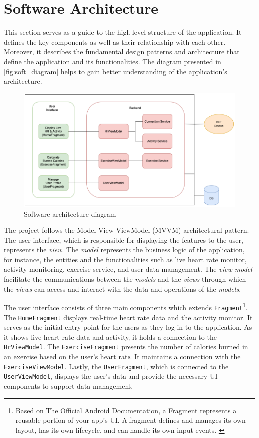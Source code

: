\section{Software Architecture}
This section serves as a guide to the high level structure of the application. It defines the key components as well as their relationship with each other.
Moreover, it describes the fundamental design patterns and architecture that define the application and its functionalities. 
The diagram presented in \autoref{fig:soft_diagram} helps to gain better understanding of the application's architecture.
\begin{figure}[H]
    \centering
    \includegraphics[width=1\textwidth]{diagrams/architecture-diagram.drawio.png}
    \caption{Software architecture diagram}
    \label{fig:soft_diagram}
\end{figure}
The project follows the Model-View-ViewModel (MVVM) architectural pattern. The user interface, which is responsible for displaying the features to the user, represents the \emph{view}. 
The \emph{model} represents the business logic of the application, for instance, the entities and the functionalities such as live heart rate monitor, activity monitoring, exercise service, and user data management. 
The \emph{view model} facilitate the communications between the \emph{models} and the \emph{views} through which the \emph{views} can access and interact with the data and operations of the \emph{models}.

The user interface consists of three main components which extends \texttt{Fragment}\footnote{Based on The Official Android Documentation, a Fragment represents a reusable portion of your app's UI. A fragment defines and manages its own layout, has its own lifecycle, and can handle its own input events. \autocite{android-fragments}}. 
The \texttt{HomeFragment} displays real-time heart rate data and the activity monitor. It serves as the initial entry point for the users as they log in to the application. As it shows live heart rate data and activity, it holds a connection to the \texttt{HrViewModel}.
The \texttt{ExerciseFragment} presents the number of calories burned in an exercise based on the user's heart rate. It maintains a connection with the \texttt{ExerciseViewModel}. Lastly, the \texttt{UserFragment}, which is connected to the \texttt{UserViewModel}, displays the user's data and provide the necessary UI components to support data management.

